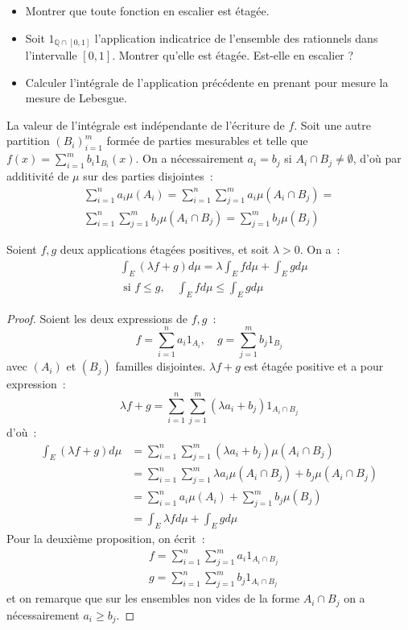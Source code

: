 \begin{exercice}
\begin{itemize}
  \item Montrer que toute fonction en escalier est étagée.
  \item Soit $1_{\mathbb{Q}\cap [0,1]}$ l'application indicatrice de l'ensemble
  des rationnels dans l'intervalle $[0,1]$. Montrer qu'elle est étagée. Est-elle
  en escalier ?
  \item Calculer l'intégrale de l'application précédente en prenant pour mesure
  la mesure de Lebesgue.
\end{itemize}
\end{exercice}
\begin{rem}
La valeur de l'intégrale est indépendante de l'écriture de $f$. Soit
une autre partition $(B_i)_{i=1}^m$ formée de parties mesurables et 
telle que $f(x) = \sum_{i=1}^m b_i 1_{B_i}(x)$. On a nécessairement
$a_i = b_j$ si $A_i \cap B_j \neq \emptyset$, d'où par additivité de
$\mu$ sur des parties disjointes~:
\begin{multline*}
\sum_{i=1}^n a_i \mu(A_i) = \sum_{i=1}^n \sum_{j=1}^m a_i \mu(A_i \cap
B_j) = \\ \sum_{i=1}^n \sum_{j=1}^m b_j \mu(A_i \cap B_j)=  \sum_{j=1}^m b_j
\mu(B_j)
\end{multline*}
\end{rem}
\begin{mandatory}
\begin{prop}\label{int:1}
Soient $f,g$ deux applications étagées positives, et soit $\lambda> 0$. On a~:
\begin{align*}
&\int_E \left( \lambda f + g \right) d\mu = \lambda \int_E f d\mu + \int_E g d
\mu\\ &\mbox{ si } f \leq g , \quad \int_E f d\mu \leq \int_E g d \mu
\end{align*}
\end{prop}
\end{mandatory}
\begin{proof}
Soient les deux expressions de $f,g$~:
\[
f = \sum_{i=1}^n a_i 1_{A_i}, \quad g = \sum_{j=1}^m b_j 1_{B_j}
\]
avec $(A_i)$ et $(B_j)$ familles disjointes.
$\lambda f +g $ est étagée positive et a pour expression~:
\[
\lambda f + g = \sum_{i=1}^n \sum_{j=1}^m (\lambda a_i + b_j) 1_{A_i \cap
B_j}
\]
d'où~:
\begin{align*}
\int_E \left( \lambda f +g \right) d \mu & = \sum_{i=1}^n \sum_{j=1}^m (\lambda
a_i + b_j) \mu(A_i \cap B_j)\\ &  = \sum_{i=1}^n \sum_{j=1}^m \lambda a_i
\mu(A_i\cap B_j) + b_j \mu(A_i \cap B_j)\\ & = \sum_{i=1}^n a_i \mu(A_i) + \sum_{j=1}^m b_j \mu(B_j)\\
	& = \int_E \lambda f d \mu + \int_E g d\mu
\end{align*}
Pour la deuxième proposition, on écrit~:
\begin{align*}
&f = \sum_{i=1}^n \sum_{j=1}^m a_i 1_{A_i\cap B_j} \\
&g = \sum_{i=1}^n \sum_{j=1}^m b_j 1_{A_i\cap B_j}
\end{align*}
et on remarque que sur les ensembles  non vides de la forme $A_i\cap B_j$ on a
nécessairement $a_i \geq b_j$.
\end{proof}

